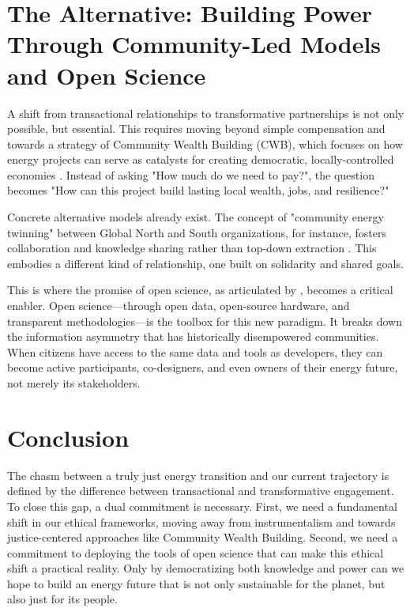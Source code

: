 \documentclass[12pt, letterpaper]{article}
\begin{document}
\section*{The Alternative: Building Power Through Community-Led Models and Open Science}

A shift from transactional relationships to transformative partnerships is not only possible, but essential. This requires moving beyond simple compensation and towards a strategy of Community Wealth Building (CWB), which focuses on how energy projects can serve as catalysts for creating democratic, locally-controlled economies \citep{hannon2023}. Instead of asking "How much do we need to pay?", the question becomes "How can this project build lasting local wealth, jobs, and resilience?"

Concrete alternative models already exist. The concept of "community energy twinning" between Global North and South organizations, for instance, fosters collaboration and knowledge sharing rather than top-down extraction \citep{eales2024}. This embodies a different kind of relationship, one built on solidarity and shared goals.

This is where the promise of open science, as articulated by \citet{pierce2019}, becomes a critical enabler. Open science---through open data, open-source hardware, and transparent methodologies---is the toolbox for this new paradigm. It breaks down the information asymmetry that has historically disempowered communities. When citizens have access to the same data and tools as developers, they can become active participants, co-designers, and even owners of their energy future, not merely its stakeholders.

\section*{Conclusion}

The chasm between a truly just energy transition and our current trajectory is defined by the difference between transactional and transformative engagement. To close this gap, a dual commitment is necessary. First, we need a fundamental shift in our ethical frameworks, moving away from instrumentalism and towards justice-centered approaches like Community Wealth Building. Second, we need a commitment to deploying the tools of open science that can make this ethical shift a practical reality. Only by democratizing both knowledge and power can we hope to build an energy future that is not only sustainable for the planet, but also just for its people.



\end{document}
